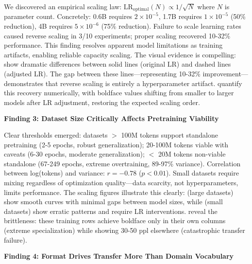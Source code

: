 We discovered an empirical scaling law: $\text{LR}_{\text{optimal}}(N) \propto 1/\sqrt{N}$ where $N$ is parameter count. Concretely: 0.6B requires $2 \times 10^{-5}$, 1.7B requires $1 \times 10^{-5}$ (50\% reduction), 4B requires $5 \times 10^{-6}$ (75\% reduction). Failure to scale learning rates caused reverse scaling in 3/10 experiments; proper scaling recovered 10-32\% performance. This finding resolves apparent model limitations as training artifacts, enabling reliable capacity scaling. The visual evidence is compelling:  show dramatic differences between solid lines (original LR) and dashed lines (adjusted LR). The gap between these lines—representing 10-32\% improvement—demonstrates that reverse scaling is entirely a hyperparameter artifact.  quantify this recovery numerically, with boldface values shifting from smaller to larger models after LR adjustment, restoring the expected scaling order.

\textbf{Finding 3: Dataset Size Critically Affects Pretraining Viability}

Clear thresholds emerged: datasets $>$ 100M tokens support standalone pretraining (2-5 epochs, robust generalization); 20-100M tokens viable with caveats (6-30 epochs, moderate generalization); $<$ 20M tokens non-viable standalone (67-249 epochs, extreme overtraining, 89-97\% variance). Correlation between log(tokens) and variance: $r = -0.78$ ($p < 0.01$). Small datasets require mixing regardless of optimization quality—data scarcity, not hyperparameters, limits performance. The scaling figures illustrate this clearly:  (large datasets) show smooth curves with minimal gaps between model sizes, while  (small datasets) show erratic patterns and require LR interventions.  reveal the brittleness: these training rows achieve boldface only in their own columns (extreme specialization) while showing 30-50 ppl elsewhere (catastrophic transfer failure).

\textbf{Finding 4: Format Drives Transfer More Than Domain Vocabulary}

